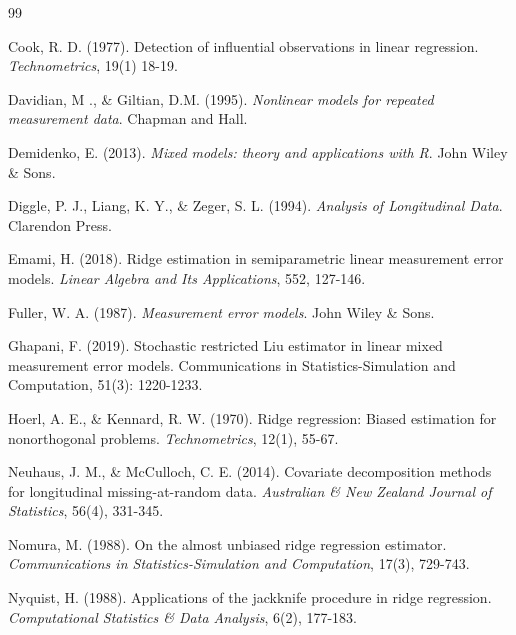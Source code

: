 \documentclass[twoside]{article}
\begin{document}
\begin{thebibliography}{99}

Cook, R. D. (1977). Detection of influential observations in linear regression.  \textit{Technometrics}, 19(1) 18-19.  


Davidian, M ., & Giltian, D.M. (1995). \textit{Nonlinear models for repeated measurement data}. Chapman and Hall. 

Demidenko, E. (2013). \textit{Mixed models: theory and applications with R}. John Wiley \& Sons.

Diggle, P. J., Liang, K. Y., \& Zeger, S. L. (1994). \textit{Analysis of Longitudinal Data}. Clarendon Press.

Emami, H. (2018). Ridge estimation in semiparametric linear measurement error models. \textit{Linear Algebra and Its Applications}, 552, 127-146.

Fuller, W. A. (1987). \textit{Measurement error models}. John Wiley \& Sons.

Ghapani, F. (2019). Stochastic restricted Liu estimator in linear mixed measurement error models. Communications in Statistics-Simulation and Computation, 51(3): 1220-1233. 

Hoerl, A. E., \& Kennard, R. W. (1970). Ridge regression: Biased estimation for nonorthogonal problems. \textit{Technometrics}, 12(1), 55-67.

Neuhaus, J. M., \& McCulloch, C. E. (2014). Covariate decomposition methods for longitudinal missing-at-random data. \textit{Australian \& New Zealand Journal of Statistics}, 56(4), 331-345.

Nomura, M. (1988). On the almost unbiased ridge regression estimator. \textit{Communications in Statistics-Simulation and Computation}, 17(3), 729-743.

Nyquist, H. (1988). Applications of the jackknife procedure in ridge regression. \textit{Computational Statistics \& Data Analysis}, 6(2), 177-183.


\end{thebibliography}
\end{document}
